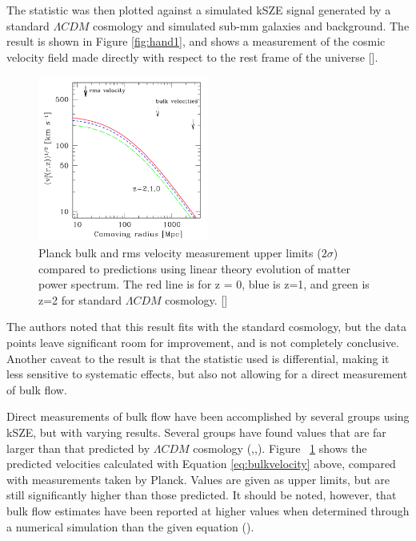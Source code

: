 \documentclass[manuscript]{aastex}
\begin{document}
The statistic was then plotted against a simulated kSZE signal generated by a standard $\Lambda CDM$  cosmology and simulated sub-mm galaxies and background.
The result is shown in Figure \ref{fig:hand1}, and shows a measurement of the cosmic velocity field made directly with respect to the rest frame of the universe [\cite{Hand2012}]. 
\begin{figure}
  \vspace{-0.8cm}
    \begin{center}
      \includegraphics[width=0.5\textwidth]{kitayama1.png}
    \end{center}
\caption[Planck constraints on bulk flow -[\cite{Kitayama2014}]{Planck bulk and rms velocity measurement upper limits (\(2\sigma\)) compared to predictions using linear theory evolution of matter power spectrum. The red line is for z = 0, blue is z=1, and green is z=2 for standard \(\Lambda CDM\) cosmology.  [\cite{Kitayama2014}]}
\label{fig:bulkflow}
\vspace{-0.8cm}
\end{figure}
The authors noted that this result fits with the standard cosmology, but the data points leave significant room for improvement, and is not completely conclusive. Another caveat to the result is that the statistic used is differential, making it less sensitive to systematic effects, but also not allowing for a direct measurement of bulk flow.  

Direct measurements of bulk flow have been accomplished by several groups using kSZE, but with varying results. Several groups have found values that are far larger than that predicted by \(\Lambda CDM\) cosmology (\cite{Kashlinsky2008},\cite{Watkins2009},\cite{Lavaux2010}). Figure ~\ref{fig:bulkflow} shows the predicted velocities calculated with Equation \ref{eq:bulkvelocity} above, compared with measurements taken by Planck. Values are given as upper limits, but are still significantly higher than those predicted. It should be noted, however, that bulk flow estimates have been reported at higher values when determined through a numerical simulation than the given equation (\cite{Kitayama2014}).
\end{document}
